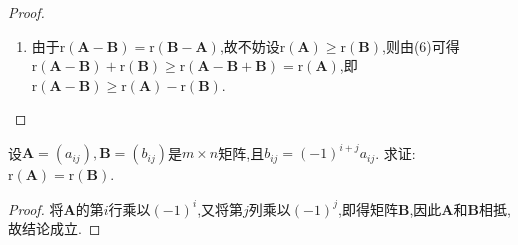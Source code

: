 \documentclass[lang=cn,newtx,10pt,scheme=chinese]{elegantbook}
\begin{document}
\begin{proof}
\begin{enumerate}[(1)]
    \item 由于\(\mathrm{r}(\boldsymbol{A}-\boldsymbol{B})=\mathrm{r}(\boldsymbol{B}-\boldsymbol{A})\),故不妨设\(\mathrm{r}(\boldsymbol{A})\geq\mathrm{r}(\boldsymbol{B})\),则由(6)可得\(\mathrm{r}(\boldsymbol{A}-\boldsymbol{B})+\mathrm{r}(\boldsymbol{B})\geq\mathrm{r}(\boldsymbol{A}-\boldsymbol{B}+\boldsymbol{B})=\mathrm{r}(\boldsymbol{A})\),即\(\mathrm{r}(\boldsymbol{A}-\boldsymbol{B})\geq\mathrm{r}(\boldsymbol{A})-\mathrm{r}(\boldsymbol{B})\).
\end{enumerate}
\end{proof}

\begin{example}
    设\(\boldsymbol{A}=(a_{ij}),\boldsymbol{B}=(b_{ij})\)是\(m\times n\)矩阵,且\(b_{ij}=(-1)^{i + j}a_{ij}\). 求证:\(\mathrm{r}(\boldsymbol{A})=\mathrm{r}(\boldsymbol{B})\).
\end{example}
\begin{proof}
    将\(\boldsymbol{A}\)的第\(i\)行乘以\((-1)^i\),又将第\(j\)列乘以\((-1)^j\),即得矩阵\(\boldsymbol{B}\),因此\(\boldsymbol{A}\)和\(\boldsymbol{B}\)相抵,故结论成立. 
\end{proof}
\end{document}
